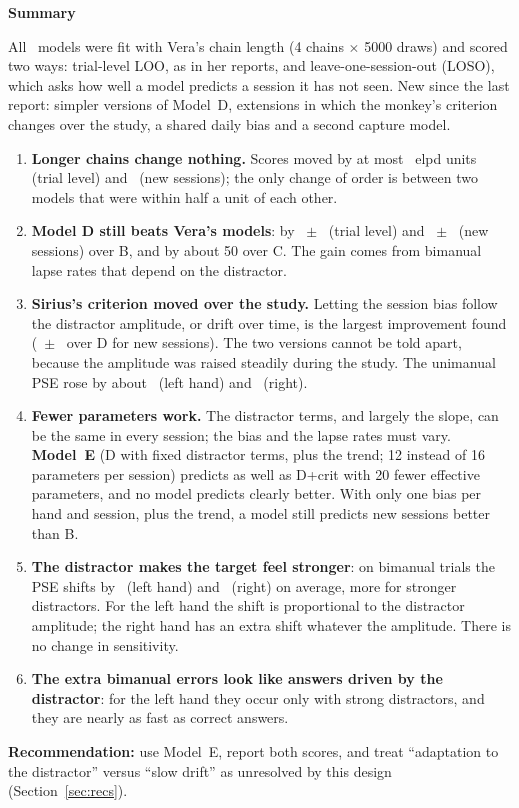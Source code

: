 \begin{keybox}
{\sffamily\bfseries Summary}\par\smallskip
All \nModels\ models were fit with Vera's chain length (4 chains $\times$ 5000 draws) and scored two ways: trial-level LOO, as in her reports, and leave-one-session-out (LOSO), which asks how well a model predicts a session it has not seen.
New since the last report: simpler versions of Model~D, extensions in which the monkey's criterion changes over the study, a shared daily bias and a second capture model.
\begin{enumerate}[leftmargin=1.3em, itemsep=0.2em]
\item \textbf{Longer chains change nothing.} Scores moved by at most \drawsMaxTrial\ elpd units (trial level) and \drawsMaxLoso\ (new sessions); the only change of order is between two models that were within half a unit of each other.
\item \textbf{Model D still beats Vera's models}: by \DvsBTrial\ $\pm$ \DvsBTrialSE\ (trial level) and \DvsBLoso\ $\pm$ \DvsBLosoSE\ (new sessions) over B, and by about 50 over C. The gain comes from bimanual lapse rates that depend on the distractor.
\item \textbf{Sirius's criterion moved over the study.} Letting the session bias follow the distractor amplitude, or drift over time, is the largest improvement found (\CritvsDLoso\ $\pm$ \CritvsDLosoSE\ over D for new sessions). The two versions cannot be told apart, because the amplitude was raised steadily during the study. The unimanual PSE rose by about \critPseLeft\um\ (left hand) and \critPseRight\um\ (right).
\item \textbf{Fewer parameters work.} The distractor terms, and largely the slope, can be the same in every session; the bias and the lapse rates must vary. \textbf{Model~E} (D with fixed distractor terms, plus the trend; 12 instead of 16 parameters per session) predicts as well as D+crit with 20 fewer effective parameters, and no model predicts clearly better. With only one bias per hand and session, plus the trend, a model still predicts new sessions better than B.
\item \textbf{The distractor makes the target feel stronger}: on bimanual trials the PSE shifts by \ShiftDfourCritLeft\um\ (left hand) and \ShiftDfourCritRight\um\ (right) on average, more for stronger distractors. For the left hand the shift is proportional to the distractor amplitude; the right hand has an extra shift whatever the amplitude. There is no change in sensitivity.
\item \textbf{The extra bimanual errors look like answers driven by the distractor}: for the left hand they occur only with strong distractors, and they are nearly as fast as correct answers.
\end{enumerate}
\textbf{Recommendation:} use Model~E, report both scores, and treat ``adaptation to the distractor'' versus ``slow drift'' as unresolved by this design (Section~\ref{sec:recs}).
\end{keybox}
